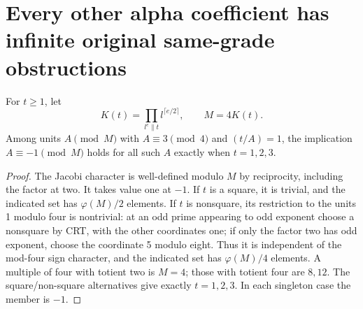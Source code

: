 \section{Every other alpha coefficient has infinite original same-grade obstructions}
\begin{lemma}
For $t\ge1$, let
\[
 K(t)=\prod_{l^e\parallel t}l^{\lceil e/2\rceil},\qquad M=4K(t).
\]
Among units $A\pmod M$ with $A\equiv3\pmod4$ and $(t/A)=1$, the implication
$A\equiv-1\pmod M$ holds for all such $A$ exactly when $t=1,2,3$.
\end{lemma}
\begin{proof}
The Jacobi character is well-defined modulo $M$ by reciprocity, including the
factor at two. It takes value one at $-1$. If $t$ is a square, it is trivial,
and the indicated set has $\varphi(M)/2$ elements. If $t$ is nonsquare, its
restriction to the units 1 modulo four is nontrivial: at an odd prime appearing
to odd exponent choose a nonsquare by CRT, with the other coordinates one; if
only the factor two has odd exponent, choose the coordinate 5 modulo eight.
Thus it is independent of the mod-four sign character, and the indicated set
has $\varphi(M)/4$ elements. A multiple of four with totient two is $M=4$;
those with totient four are $8,12$. The square/non-square alternatives give
exactly $t=1,2,3$. In each singleton case the member is $-1$.
\end{proof}

